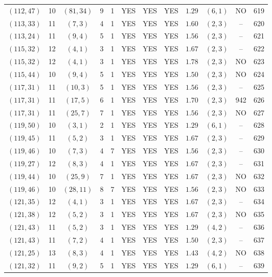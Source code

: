 \begin{longtable}{|c|c|c|c|c|c|c|c|c|c|c|c|}
$(112,47)$ & 10 & $(81,34)$ & 9 & 1 & YES & YES & YES & $1.29$ & $(6,1)$ & NO & 619\\
$(113,33)$ & 11 & $(7,3)$ & 4 & 1 & YES & YES & YES & $1.60$ & $(2,3)$ & -- & 620\\
$(113,24)$ & 11 & $(9,4)$ & 5 & 1 & YES & YES & YES & $1.56$ & $(2,3)$ & -- & 621\\
$(115,32)$ & 12 & $(4,1)$ & 3 & 1 & YES & YES & YES & $1.67$ & $(2,3)$ & -- & 622\\
$(115,32)$ & 12 & $(4,1)$ & 3 & 1 & YES & YES & YES & $1.78$ & $(2,3)$ & NO & 623\\
$(115,44)$ & 10 & $(9,4)$ & 5 & 1 & YES & YES & YES & $1.50$ & $(2,3)$ & NO & 624\\
$(117,31)$ & 11 & $(10,3)$ & 5 & 1 & YES & YES & YES & $1.56$ & $(2,3)$ & -- & 625\\
$(117,31)$ & 11 & $(17,5)$ & 6 & 1 & YES & YES & YES & $1.70$ & $(2,3)$ & 942 & 626\\
$(117,31)$ & 11 & $(25,7)$ & 7 & 1 & YES & YES & YES & $1.56$ & $(2,3)$ & NO & 627\\
$(119,50)$ & 10 & $(3,1)$ & 2 & 1 & YES & YES & YES & $1.29$ & $(6,1)$ & -- & 628\\
$(119,45)$ & 11 & $(5,2)$ & 3 & 1 & YES & YES & YES & $1.67$ & $(2,3)$ & -- & 629\\
$(119,46)$ & 10 & $(7,3)$ & 4 & 7 & YES & YES & YES & $1.56$ & $(2,3)$ & -- & 630\\
$(119,27)$ & 12 & $(8,3)$ & 4 & 1 & YES & YES & YES & $1.67$ & $(2,3)$ & -- & 631\\
$(119,44)$ & 10 & $(25,9)$ & 7 & 1 & YES & YES & YES & $1.67$ & $(2,3)$ & NO & 632\\
$(119,46)$ & 10 & $(28,11)$ & 8 & 7 & YES & YES & YES & $1.56$ & $(2,3)$ & NO & 633\\
$(121,35)$ & 12 & $(4,1)$ & 3 & 1 & YES & YES & YES & $1.67$ & $(2,3)$ & -- & 634\\
$(121,38)$ & 12 & $(5,2)$ & 3 & 1 & YES & YES & YES & $1.67$ & $(2,3)$ & NO & 635\\
$(121,43)$ & 11 & $(5,2)$ & 3 & 1 & YES & YES & YES & $1.29$ & $(4,2)$ & -- & 636\\
$(121,43)$ & 11 & $(7,2)$ & 4 & 1 & YES & YES & YES & $1.50$ & $(2,3)$ & -- & 637\\
$(121,25)$ & 13 & $(8,3)$ & 4 & 1 & YES & YES & YES & $1.43$ & $(4,2)$ & NO & 638\\
$(121,32)$ & 11 & $(9,2)$ & 5 & 1 & YES & YES & YES & $1.29$ & $(6,1)$ & -- & 639\\

\end{longtable}
